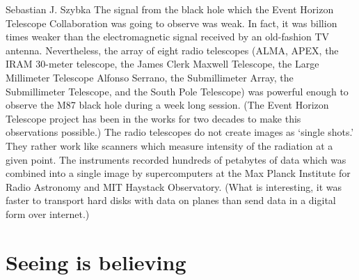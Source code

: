 \begin{artengenv}{Sebastian J. Szybka}
The signal from the black hole which the Event Horizon Telescope Collaboration was going to observe was weak. In fact, it was billion times weaker than the electromagnetic signal received by an old-fashion TV antenna. Nevertheless, the array of eight radio telescopes (ALMA, APEX, the IRAM 30-meter telescope, the James Clerk Maxwell Telescope, the Large Millimeter Telescope Alfonso Serrano, the Submillimeter Array, the Submillimeter Telescope, and the South Pole Telescope) was powerful enough to observe the M87 black hole during a week long session. (The Event Horizon Telescope project has been in the works for two decades to make this observations possible.) The radio telescopes do not create images as `single shots.' They rather work like scanners which measure intensity of the radiation at a given point. The instruments recorded hundreds of petabytes of data which was combined into a single image by supercomputers at the Max Planck Institute for Radio Astronomy and MIT Haystack Observatory. (What is interesting, it was faster to transport hard disks with data on planes than send data in a digital form over internet.) 

\section{Seeing is believing}


\end{artengenv}
